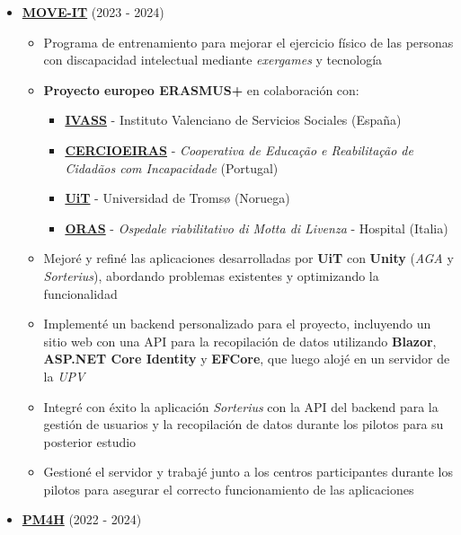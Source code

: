 \documentclass[letterpaper, 12pt, dvipsnames]{article}
\newcommand{\upv}{UPV}
\begin{document}
\begin{itemize}
    \item {\large\textbf{\href{https://moveit.webs.upv.es/es/}{MOVE-IT}}} (2023 - 2024)
          \begin{itemize}
              \item Programa de entrenamiento para mejorar el ejercicio físico de las personas con discapacidad intelectual mediante \textit{exergames} y tecnología
              \item \textbf{Proyecto europeo ERASMUS+} en colaboración con:
                    \begin{itemize}
                        \item \textbf{\href{https://www.ivass.gva.es/}{IVASS}} - Instituto Valenciano de Servicios Sociales (España)
                        \item \textbf{\href{https://www.cercioeiras.pt/pt}{CERCIOEIRAS}} - \textit{Cooperativa de Educação e Reabilitação de Cidadãos com Incapacidade} (Portugal)
                        \item \textbf{\href{https://en.uit.no/}{UiT}} - Universidad de Tromsø (Noruega)
                        \item \textbf{\href{https://www.ospedalemotta.it/it/}{ORAS}} - \textit{Ospedale riabilitativo di Motta di Livenza} - Hospital (Italia)
                    \end{itemize}
            \item Mejoré y refiné las aplicaciones desarrolladas por \textbf{UiT} con \textbf{Unity} (\textit{AGA} y \textit{Sorterius}), abordando problemas existentes y optimizando la funcionalidad
            \item Implementé un backend personalizado para el proyecto, incluyendo un sitio web con una API para la recopilación de datos utilizando \textbf{Blazor}, \textbf{ASP.NET Core Identity} y \textbf{EFCore}, que luego alojé en un servidor de la \textit{\upv}
            \item Integré con éxito la aplicación \textit{Sorterius} con la API del backend para la gestión de usuarios y la recopilación de datos durante los pilotos para su posterior estudio
            \item Gestioné el servidor y trabajé junto a los centros participantes durante los pilotos para asegurar el correcto funcionamiento de las aplicaciones
          \end{itemize}
    \item {\large\textbf{\href{https://pm4health.com/}{PM4H}}} (2022 - 2024)

\end{itemize}
\end{document}
